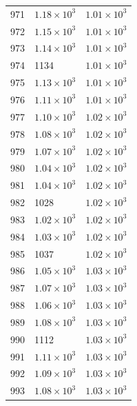 \begin{table}[H]
\begin{tabular}{lll}
971 & $\displaystyle 1.18 \times 10^{3}$ & $\displaystyle 1.01 \times 10^{3}$ \\
972 & $\displaystyle 1.15 \times 10^{3}$ & $\displaystyle 1.01 \times 10^{3}$ \\
973 & $\displaystyle 1.14 \times 10^{3}$ & $\displaystyle 1.01 \times 10^{3}$ \\
974 & 1134 & $\displaystyle 1.01 \times 10^{3}$ \\
975 & $\displaystyle 1.13 \times 10^{3}$ & $\displaystyle 1.01 \times 10^{3}$ \\
976 & $\displaystyle 1.11 \times 10^{3}$ & $\displaystyle 1.01 \times 10^{3}$ \\
977 & $\displaystyle 1.10 \times 10^{3}$ & $\displaystyle 1.02 \times 10^{3}$ \\
978 & $\displaystyle 1.08 \times 10^{3}$ & $\displaystyle 1.02 \times 10^{3}$ \\
979 & $\displaystyle 1.07 \times 10^{3}$ & $\displaystyle 1.02 \times 10^{3}$ \\
980 & $\displaystyle 1.04 \times 10^{3}$ & $\displaystyle 1.02 \times 10^{3}$ \\
981 & $\displaystyle 1.04 \times 10^{3}$ & $\displaystyle 1.02 \times 10^{3}$ \\
982 & 1028 & $\displaystyle 1.02 \times 10^{3}$ \\
983 & $\displaystyle 1.02 \times 10^{3}$ & $\displaystyle 1.02 \times 10^{3}$ \\
984 & $\displaystyle 1.03 \times 10^{3}$ & $\displaystyle 1.02 \times 10^{3}$ \\
985 & 1037 & $\displaystyle 1.02 \times 10^{3}$ \\
986 & $\displaystyle 1.05 \times 10^{3}$ & $\displaystyle 1.03 \times 10^{3}$ \\
987 & $\displaystyle 1.07 \times 10^{3}$ & $\displaystyle 1.03 \times 10^{3}$ \\
988 & $\displaystyle 1.06 \times 10^{3}$ & $\displaystyle 1.03 \times 10^{3}$ \\
989 & $\displaystyle 1.08 \times 10^{3}$ & $\displaystyle 1.03 \times 10^{3}$ \\
990 & 1112 & $\displaystyle 1.03 \times 10^{3}$ \\
991 & $\displaystyle 1.11 \times 10^{3}$ & $\displaystyle 1.03 \times 10^{3}$ \\
992 & $\displaystyle 1.09 \times 10^{3}$ & $\displaystyle 1.03 \times 10^{3}$ \\
993 & $\displaystyle 1.08 \times 10^{3}$ & $\displaystyle 1.03 \times 10^{3}$ \\

\end{tabular}
\end{table}
